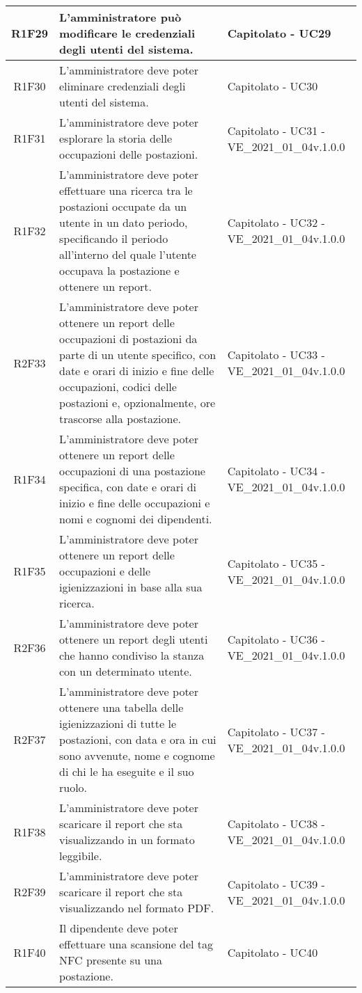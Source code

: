 \begin{center}
\begin{longtable}{|c|p{10cm}|p{4cm}|}
		\hline
		R1F29&L'amministratore può modificare le credenziali degli utenti del sistema.	&Capitolato - UC29	\\
		\hline
		R1F30&L'amministratore deve poter eliminare credenziali degli utenti del sistema.	& Capitolato - UC30	\\
		\hline	
		R1F31&L'amministratore deve poter esplorare la storia delle occupazioni delle postazioni.	& Capitolato - UC31 - VE\_2021\_01\_04v.1.0.0	\\
		\hline
		R1F32&L'amministratore deve poter effettuare una ricerca tra le postazioni occupate da un utente in un dato periodo, specificando il periodo all'interno del quale l'utente occupava la postazione e ottenere un report. & 	Capitolato - UC32 - VE\_2021\_01\_04v.1.0.0\\
		\hline
		R2F33&L'amministratore deve poter ottenere un report delle occupazioni di postazioni da parte di un utente specifico, con date e orari di inizio e fine delle occupazioni,  codici delle postazioni e, opzionalmente, ore trascorse alla postazione. & 	Capitolato - UC33 - VE\_2021\_01\_04v.1.0.0\\
		\hline
		R1F34&L'amministratore deve poter ottenere un report delle occupazioni di una postazione specifica, con date e orari di inizio e fine delle occupazioni e nomi e cognomi dei dipendenti.	&Capitolato - UC34 - VE\_2021\_01\_04v.1.0.0	\\
		\hline
		R1F35&L'amministratore deve poter ottenere un report delle occupazioni e delle igienizzazioni in base alla sua ricerca.	&Capitolato - UC35 - VE\_2021\_01\_04v.1.0.0	\\
		\hline
		R2F36 & L'amministratore deve poter ottenere un report degli utenti che hanno condiviso la stanza con un determinato utente. & Capitolato - UC36 - VE\_2021\_01\_04v.1.0.0\\
		\hline
		R2F37&L'amministratore deve poter ottenere una tabella delle igienizzazioni di tutte le postazioni, con data e ora in cui sono avvenute, nome e cognome di chi le ha eseguite e il suo ruolo.	&Capitolato - UC37 - VE\_2021\_01\_04v.1.0.0	\\
		\hline
		R1F38 & L'amministratore deve poter scaricare il report che sta visualizzando in un formato leggibile. & Capitolato - UC38 - VE\_2021\_01\_04v.1.0.0\\
		\hline	
		R2F39 & L'amministratore deve poter scaricare il report che sta visualizzando nel formato PDF. & Capitolato - UC39 - VE\_2021\_01\_04v.1.0.0\\
		\hline		 
		R1F40 & Il dipendente deve poter effettuare una scansione del tag NFC presente su una postazione. & Capitolato - UC40\\

\end{longtable}
\end{center}
